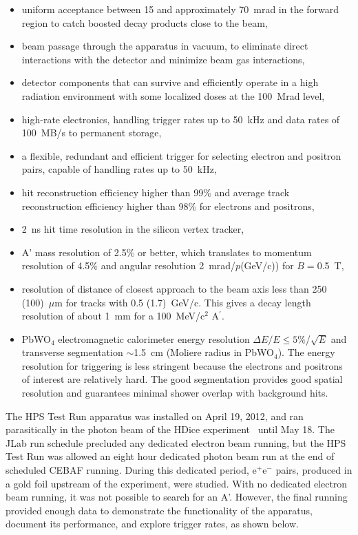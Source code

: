 \documentclass[final,3p,times,twocolumn]{elsarticle}
\newcommand{\Aprime}{A\ensuremath{^\prime}}
\newcommand{\ee}{e$^+$e$^-$}
\begin{document}
\begin{itemize}
\item uniform acceptance between 15 and approximately 70~mrad in the forward region to catch boosted decay products close to the beam, 
\item beam passage through the apparatus in vacuum, to eliminate direct interactions with the 
detector and minimize beam gas interactions, 
\item detector components that can survive and efficiently operate in a high radiation environment 
with some localized doses at the 100~Mrad level,
\item high-rate electronics, handling trigger rates up to 50~kHz and data rates of 100~MB/s to permanent 
storage, 
\item a flexible, redundant and efficient trigger for selecting electron and positron pairs,
capable of handling rates up to 50~kHz,
\item hit reconstruction efficiency higher than 99\% and average track reconstruction efficiency higher than 98\% for electrons and positrons,
\item 2~ns hit time resolution in the silicon vertex tracker, 
\item A' mass resolution of 2.5\% or better, which translates to momentum resolution of 4.5\% and angular 
resolution 2~mrad/$p$(GeV/c)) for $B$$=$0.5~T,
\item resolution of distance of closest approach to the beam axis less than 250 (100)~$\mu$m for tracks with 
0.5 (1.7)~GeV/c. This gives a decay length resolution of about 1~mm for a 100~MeV/c$^2$ \Aprime{}.
\item PbWO$_{4}$ electromagnetic calorimeter energy resolution $\Delta E/E$$\leq$$5\%$/$\sqrt{E}$ and transverse
segmentation $\sim$1.5~cm (Moliere radius in PbWO$_{4}$).  The energy resolution for triggering is less 
stringent because the electrons and positrons of interest are relatively hard. 
The good segmentation provides good spatial resolution and guarantees minimal shower overlap with background hits.
\end{itemize}

The HPS Test Run apparatus was installed on April 19, 2012, and ran parasitically in the photon beam of the HDice 
experiment~\cite{HDice} until May 18. The JLab run schedule 
precluded any dedicated electron beam running, but the HPS Test Run was allowed an eight hour 
dedicated photon beam run at the end of scheduled CEBAF running. During this dedicated 
period, \ee{} pairs, produced in a gold foil upstream of the experiment, were studied. With no dedicated 
electron beam running, it was not possible to search for an A'. However, the final running
provided enough data to demonstrate the functionality of the apparatus, document its performance, and 
explore trigger rates, as shown below.
\end{document}
